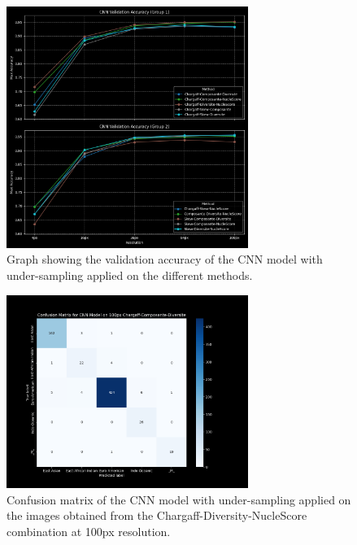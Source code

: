 \begin{appendices}
	\begin{figure}[htbp!]
		\centering
		\includegraphics[width=0.7\textwidth]{../imgs/graphs/kfold/cnn_validation_accuracy_groups_mask_5_kfold_aug.png}
		\caption{Graph showing the validation accuracy of the CNN model with under-sampling applied on the different methods.}
		\label{fig:augmentation_accuracy}
	\end{figure}

	\begin{figure}[htbp!]
		\centering
		\includegraphics[width=0.7\textwidth]{../imgs/graphs/kfold/cnn_confusion_matrix_100px_mask_5-kfold_aug.png}
		\caption{Confusion matrix of the CNN model with under-sampling applied on the images obtained from the Chargaff-Diversity-NucleScore
			combination at 100px resolution.}
		\label{fig:augmentation_confusion_matrix}
	\end{figure}


\end{appendices}
